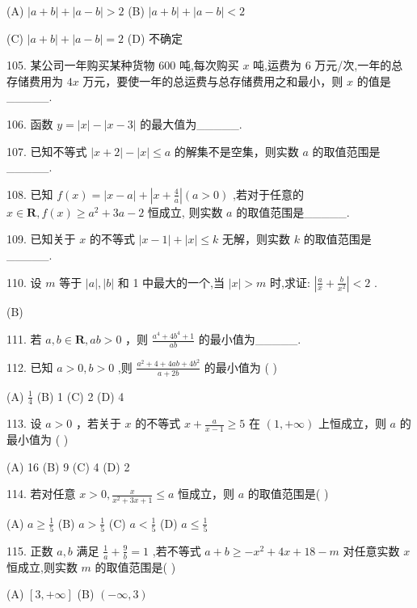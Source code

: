 \documentclass[10pt]{article}
\begin{document}
(A) \(\left| {a + b}\right|  + \left| {a - b}\right|  > 2\) (B) \(\left| {a + b}\right|  + \left| {a - b}\right|  < 2\)

(C) \(\left| {a + b}\right|  + \left| {a - b}\right|  = 2\) (D) 不确定

105. 某公司一年购买某种货物 600 吨,每次购买 \(x\) 吨,运费为 6 万元/次,一年的总存储费用为 \({4x}\) 万元，要使一年的总运费与总存储费用之和最小，则 \(x\) 的值是\_\_\_\_\_.

106. 函数 \(y = \left| x\right|  - \left| {x - 3}\right|\) 的最大值为\_\_\_\_\_.

107. 已知不等式 \(\left| {x + 2}\right|  - \left| x\right|  \leq  a\) 的解集不是空集，则实数 \(a\) 的取值范围是\_\_\_\_\_.

108. 已知 \(f\left( x\right)  = \left| {x - a}\right|  + \left| {x + \frac{4}{a}}\right| \left( {a > 0}\right)\) ,若对于任意的 \(x \in  \mathbf{R},f\left( x\right)  \geq  {a}^{2} + {3a} - 2\) 恒成立, 则实数 \(a\) 的取值范围是\_\_\_\_\_.

109. 已知关于 \(x\) 的不等式 \(\left| {x - 1}\right|  + \left| x\right|  \leq  k\) 无解，则实数 \(k\) 的取值范围是\_\_\_\_\_.

110. 设 \(m\) 等于 \(\left| a\right| ,\left| b\right|\) 和 1 中最大的一个,当 \(\left| x\right|  > m\) 时,求证: \(\left| {\frac{a}{x} + \frac{b}{{x}^{2}}}\right|  < 2\) .

(B)

111. 若 \(a,b \in  \mathbf{R},{ab} > 0\) ，则 \(\frac{{a}^{4} + 4{b}^{4} + 1}{ab}\) 的最小值为\_\_\_\_\_.

112. 已知 \(a > 0,b > 0\) ,则 \(\frac{{a}^{2} + 4 + {4ab} + 4{b}^{2}}{a + {2b}}\) 的最小值为 ( )

(A) \(\frac{1}{4}\) (B) 1 (C) 2 (D) 4

113. 设 \(a > 0\) ，若关于 \(x\) 的不等式 \(x + \frac{a}{x - 1} \geq  5\) 在 \(\left( {1, + \infty }\right)\) 上恒成立，则 \(a\) 的最小值为 ( )

(A) 16 (B) 9 (C) 4 (D) 2

114. 若对任意 \(x > 0,\frac{x}{{x}^{2} + {3x} + 1} \leq  a\) 恒成立，则 \(a\) 的取值范围是( )

(A) \(a \geq  \frac{1}{5}\) (B) \(a > \frac{1}{5}\) (C) \(a < \frac{1}{5}\) (D) \(a \leq  \frac{1}{5}\)

115. 正数 \(a,b\) 满足 \(\frac{1}{a} + \frac{9}{b} = 1\) ,若不等式 \(a + b \geq   - {x}^{2} + {4x} + {18} - m\) 对任意实数 \(x\) 恒成立,则实数 \(m\) 的取值范围是( )

(A) \(\left\lbrack  {3, + \infty }\right\rbrack\) (B) \(\left( {-\infty ,3}\right)\)
\end{document}
